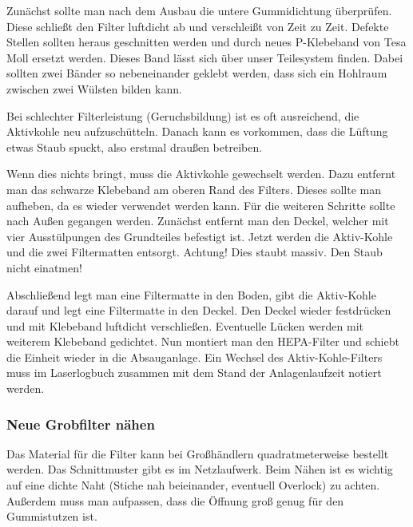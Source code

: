 \documentclass{\basedir/fablab-document}
\begin{document}
	Zunächst sollte man nach dem Ausbau die untere Gummidichtung überprüfen. Diese schließt den Filter luftdicht ab und verschleißt von Zeit zu Zeit. Defekte Stellen sollten heraus geschnitten werden und durch neues P-Klebeband von Tesa Moll ersetzt werden. Dieses Band lässt sich über unser Teilesystem finden. Dabei sollten zwei Bänder so nebeneinander geklebt werden, dass sich ein Hohlraum zwischen zwei Wülsten bilden kann.
	
	Bei schlechter Filterleistung (Geruchsbildung) ist es oft ausreichend, die Aktivkohle neu aufzuschütteln. Danach kann es vorkommen, dass die Lüftung etwas Staub spuckt, also erstmal draußen betreiben.
	
	Wenn dies nichts bringt, muss die Aktivkohle gewechselt werden. Dazu entfernt man das schwarze Klebeband am oberen Rand des Filters. Dieses sollte man aufheben, da es wieder verwendet werden kann. Für die weiteren Schritte sollte nach Außen gegangen werden. Zunächst entfernt man den Deckel, welcher mit vier Ausstülpungen des Grundteiles befestigt ist. Jetzt werden die Aktiv-Kohle und die zwei Filtermatten entsorgt. Achtung! Dies staubt massiv. Den Staub nicht einatmen!
	
	Abschließend legt man eine Filtermatte in den Boden, gibt die Aktiv-Kohle darauf und legt eine Filtermatte in den Deckel. Den Deckel wieder festdrücken und mit Klebeband luftdicht verschließen. Eventuelle Lücken werden mit weiterem Klebeband gedichtet. Nun montiert man den HEPA-Filter und schiebt die Einheit wieder in die Absauganlage.
	Ein Wechsel des Aktiv-Kohle-Filters muss im Laserlogbuch zusammen mit dem Stand der Anlagenlaufzeit notiert werden.
	\subsubsection{Neue Grobfilter nähen}
	Das Material für die Filter kann bei Großhändlern quadratmeterweise bestellt werden. Das Schnittmuster gibt es im Netzlaufwerk. Beim Nähen ist es wichtig auf eine dichte Naht (Stiche nah beieinander, eventuell Overlock) zu achten. Außerdem muss man aufpassen, dass die Öffnung groß genug für den Gummistutzen ist.
\end{document}
